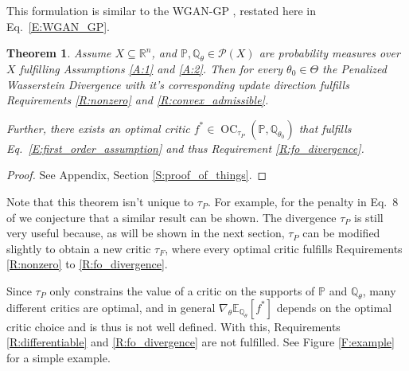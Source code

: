 \documentclass{article}
\DeclareMathOperator{\oc}{OC}
\newtheorem{theorem}{Theorem}
\begin{document}
 This formulation is similar to the WGAN-GP \cite{gulrajani2017improved}, restated here in Eq.\ \ref{E:WGAN_GP}.
 \begin{theorem}\label{T:pwgan_theorem}
  Assume $X\subseteq\mathbb R^n$, and $\mathbb P,\mathbb Q_\theta\in\mathcal P(X)$ are probability measures over
  $X$ fulfilling Assumptions \ref{A:1} and \ref{A:2}.
  Then for every $\theta_0\in\Theta$ the Penalized Wasserstein Divergence with it's corresponding update direction
  fulfills Requirements \ref{R:nonzero} and \ref{R:convex_admissible}.
  
  Further, there exists an optimal critic $f^*\in\oc_{\tau_P}(\mathbb P,\mathbb Q_{\theta_0})$ that
  fulfills Eq.\ \ref{E:first_order_assumption} and thus Requirement \ref{R:fo_divergence}.
 \end{theorem}
 \begin{proof}
  See Appendix, Section \ref{S:proof_of_things}.
 \end{proof}

 Note that this theorem isn't unique to $\tau_P$.
 For example, for the penalty in Eq.\ 8 of \cite{petzka2017regularization} we conjecture that a similar result can be shown.
 The divergence $\tau_P$ is still very useful because, as will be shown in the next section,
 $\tau_P$ can be modified slightly to obtain a new critic $\tau_F$, where every optimal critic
 fulfills Requirements \ref{R:nonzero} to \ref{R:fo_divergence}.
 
 Since $\tau_P$ only constrains the value of a critic on the supports of $\mathbb P$ and $\mathbb Q_\theta$, 
 many different critics are optimal, and in general $\nabla_\theta\mathbb E_{\mathbb Q_\theta}[f^*]$ depends on the optimal critic choice and is thus is not well defined.
 With this, Requirements \ref{R:differentiable} and \ref{R:fo_divergence} are not fulfilled.
 See Figure \ref{F:example} for a simple example.
 
\end{document}
